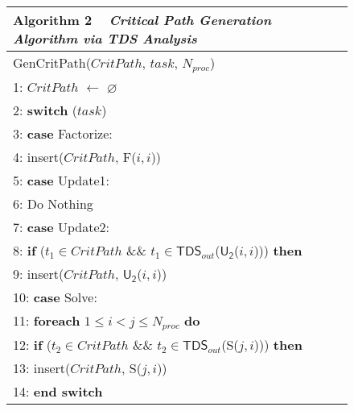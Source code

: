 \documentclass[12pt]{elsarticle}
\begin{document}
\begin{figure}\centering
\begin{tabular}{@{}p{\columnwidth}@{}}
\toprule
\textbf{Algorithm 2} ~ \textit{Critical Path Generation Algorithm via TDS Analysis}
\\\midrule
\textsf{GenCritPath}\textsf{(}$CritPath$, $task$, $N_{proc}$\textsf{)}\\
\hspace{2.09mm}1: $CritPath$ $\leftarrow$ $\varnothing$\\
\hspace{2.09mm}2: \textbf{switch} ($task$)\\
\hspace{2.09mm}3: \quad \textbf{case} \textsf{Factorize}:\\
\hspace{2.09mm}4: \quad\quad \textsf{insert($CritPath$, F($i,i$))}\\
\hspace{2.09mm}5: \quad \textbf{case} \textsf{Update1}:\\
\hspace{2.09mm}6: \quad\quad \textsf{Do Nothing}\\
\hspace{2.09mm}7: \quad \textbf{case} \textsf{Update2}:\\
\hspace{2.09mm}8: \quad\quad \textbf{if} ($t_1 \in CritPath$ \&\& $t_1 \in \mathsf{TDS}_{out}$\textsf{($\mathsf{U_2}$($i,i$))}) \textbf{then}\\
\hspace{2.09mm}9: \quad\quad\quad \textsf{insert($CritPath$, $\mathsf{U_2}$($i,i$))}\\
10: \quad \textbf{case} \textsf{Solve}:\\
11: \quad\quad \textbf{foreach} $1 \leq i < j \leq N_{proc}$ \textbf{do}\\
12: \quad\quad\quad \textbf{if} ($t_2 \in CritPath$ \&\& $t_2 \in \mathsf{TDS}_{out}$\textsf{(S($j,i$))}) \textbf{then}\\13: \quad\quad\quad\quad \textsf{insert($CritPath$, S($j,i$))}\\
14: \textbf{end switch}\\
\midrule
\end{tabular}
\end{figure}
\end{document}
